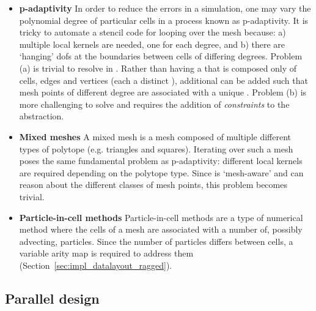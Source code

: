 \begin{itemize}
  \item
    \textbf{p-adaptivity}
    In order to reduce the errors in a simulation, one may vary the polynomial degree of particular cells in a process known as p-adaptivity.
    It is tricky to automate a stencil code for looping over the mesh because:
    a) multiple local kernels are needed, one for each degree, and b) there are `hanging' \glspl{dof} at the boundaries between cells of differing degrees.
    Problem (a) is trivial to resolve in .
    Rather than having a  that is composed only of cells, edges and vertices (each a distinct ), additional  can be added such that mesh points of different degree are associated with a unique .
    Problem (b) is more challenging to solve and requires the addition of \textit{constraints} to the abstraction.

  \item
    \textbf{Mixed meshes}
    A mixed mesh is a mesh composed of multiple different types of polytope (e.g. triangles and squares).
    Iterating over such a mesh poses the same fundamental problem as p-adaptivity: different local kernels are required depending on the polytope type.
    Since  is `mesh-aware' and can reason about the different classes of mesh points, this problem becomes trivial.

  \item
    \textbf{Particle-in-cell methods}
    Particle-in-cell methods are a type of numerical method where the cells of a mesh are associated with a number of, possibly advecting, particles.
    Since the number of particles differs between cells, a variable arity map is required to address them (Section~\ref{sec:impl_datalayout_ragged}).
\end{itemize}

\subsection{Parallel design}
\label{sec:impl_parallel}

